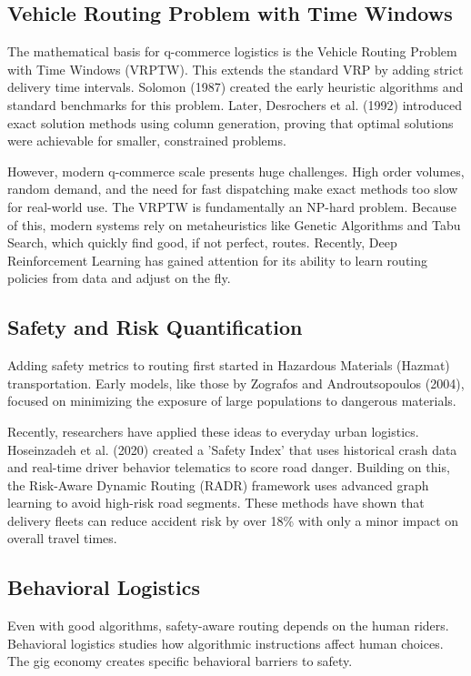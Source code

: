 \documentclass[10pt,twocolumn,letterpaper]{article}
\begin{document}
\subsection{Vehicle Routing Problem with Time Windows}

The mathematical basis for q-commerce logistics is the Vehicle Routing Problem with Time Windows (VRPTW). This extends the standard VRP by adding strict delivery time intervals. Solomon (1987) created the early heuristic algorithms and standard benchmarks for this problem. Later, Desrochers et al. (1992) introduced exact solution methods using column generation, proving that optimal solutions were achievable for smaller, constrained problems.

However, modern q-commerce scale presents huge challenges. High order volumes, random demand, and the need for fast dispatching make exact methods too slow for real-world use. The VRPTW is fundamentally an NP-hard problem. Because of this, modern systems rely on metaheuristics like Genetic Algorithms and Tabu Search, which quickly find good, if not perfect, routes. Recently, Deep Reinforcement Learning has gained attention for its ability to learn routing policies from data and adjust on the fly.

\subsection{Safety and Risk Quantification}

Adding safety metrics to routing first started in Hazardous Materials (Hazmat) transportation. Early models, like those by Zografos and Androutsopoulos (2004), focused on minimizing the exposure of large populations to dangerous materials. 

Recently, researchers have applied these ideas to everyday urban logistics. Hoseinzadeh et al. (2020) created a 'Safety Index' that uses historical crash data and real-time driver behavior telematics to score road danger. Building on this, the Risk-Aware Dynamic Routing (RADR) framework uses advanced graph learning to avoid high-risk road segments. These methods have shown that delivery fleets can reduce accident risk by over 18\% with only a minor impact on overall travel times.

\subsection{Behavioral Logistics}

Even with good algorithms, safety-aware routing depends on the human riders. Behavioral logistics studies how algorithmic instructions affect human choices. The gig economy creates specific behavioral barriers to safety. 
\end{document}
